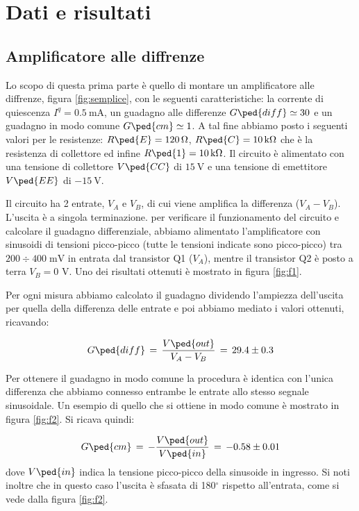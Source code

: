 \section*{Dati e risultati}

\subsection*{Amplificatore alle diffrenze}

Lo scopo di questa prima parte è quello di montare un amplificatore alle diffrenze, figura \ref{fig:semplice}, con le seguenti caratteristiche: la corrente di quiescenza $I^q=\SI{0.5}{\milli\ampere}$, un guadagno alle differenze $G\ped{diff} \simeq 30$ e un guadagno in modo comune $G\ped{cm} \simeq 1$.
A tal fine abbiamo posto i seguenti valori per le resistenze: $R\ped{E} = \SI{120}{\ohm}$, $R\ped{C} = \SI{10}{\kilo\ohm}$ che è la resistenza di collettore ed infine $R\ped{1} = \SI{10}{\kilo\ohm}$. Il circuito è alimentato con una tensione di collettore $V\ped{CC}$ di $\SI{15}{\volt}$ e una tensione di emettitore $V\ped{EE}$ di $\SI{-15}{\volt}$.

Il circuito ha 2 entrate, $V_A$ e $V_B$, di cui viene amplifica la differenza ($V_A - V_B$). L'uscita è a singola terminazione.
per verificare il funzionamento del circuito e calcolare il guadagno differenziale, abbiamo alimentato
l'amplificatore con sinusoidi di tensioni picco-picco (tutte le tensioni indicate sono picco-picco) tra $200 \div 400 \; \si{\milli\volt}$
in entrata dal transistor Q1 ($V_A$), mentre il transistor Q2 è posto a terra $V_B = 0$ V.
Uno dei risultati ottenuti è mostrato in figura \ref{fig:f1}.

Per ogni misura abbiamo calcolato il guadagno dividendo l'ampiezza dell'uscita per quella della differenza delle entrate e poi abbiamo mediato i valori ottenuti,
ricavando:

\begin{equation}
    G\ped{diff}\,=\,\frac{V\ped{out}}{V_A-V_B}\,=\, 29.4 \pm 0.3
    \label{eq:G_diff}
\end{equation}

Per ottenere il guadagno in modo comune la procedura è identica con l'unica differenza che abbiamo connesso entrambe le entrate allo stesso segnale sinusoidale.
Un esempio di quello che si ottiene in modo comune è mostrato in figura \ref{fig:f2}.
Si ricava quindi:

\begin{equation}
    G\ped{cm}\,=\,-\frac{V\ped{out}}{V\ped{in}}\,=\, -0.58 \pm 0.01
	\label{eq:G_cm}
\end{equation}
%
dove $V\ped{in}$ indica la tensione picco-picco della sinusoide in ingresso. Si noti inoltre che in questo caso l'uscita è sfasata di 180$^\circ$ rispetto all'entrata,
come si vede dalla figura \ref{fig:f2}.

